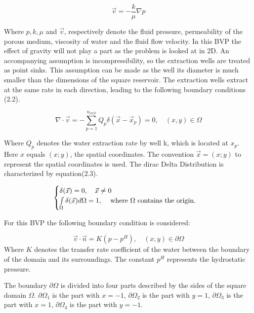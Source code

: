 \documentclass[a4paper]{report}
\begin{document}
\begin{equation}
\vec{v}=-\frac{k}{\mu}\nabla p
\end{equation}
\medskip

Where $ p, k, \mu$ and $\vec{v}$, respectively denote the 
fluid pressure, permeability of the porous medium, viscosity of water and the fluid flow velocity. In this BVP the effect of gravity will not play a part as the problem is looked at in 2D. An accompanying assumption is incompressibility, so the extraction wells are treated as point sinks. This assumption can be made as the well its diameter is much smaller than the dimensions of the square reservoir. The extraction wells extract at the same rate in each direction, leading to the following boundary conditions (2.2).


\begin{equation}
	\nabla\cdot\vec{v}=-\sum_{p=1}^{n_{well}}Q_p\delta(\vec{x}-\vec{x}_p)=0,\quad (x,y) 	\in\Omega 
\end{equation}

Where $Q_p$ denotes the water extraction rate by well k, which is located at $x_p$. Here $x$ equals $(x;y)$, the spatial coordinates.  The convention $\vec{x} = (x; y) $ to represent the spatial coordinates is used. The dirac Delta Distribution is characterized by equation(2.3).

\begin{equation}
	\begin{cases} 
		\delta(\vec{x}) = 0,\quad  \vec{x} \neq 0 \\
		 \int\limits_{\Omega}\delta(\vec{x})d\Omega = 1, \quad $  where $\Omega $  contains the origin.$
	\end{cases} 
\end{equation}

\medskip

For this BVP the following boundary condition is considered: 

\begin{equation}
	\vec{v}\cdot\vec{n}=K(p-p^H), \quad (x,y) \in  \partial\Omega
\end{equation}
Where $K$ denotes the transfer rate coefficient of the water between the boundary of the domain and its surroundings. The constant $p^H$ represents the hydrostatic pressure. 

The boundary $\partial\Omega$ is divided into four parts described by the sides of the square domain $\Omega$. $\partial\Omega_1$ is the part with $x = -1$, $\partial\Omega_2$ is the part with $y = 1$, $\partial\Omega_3$ is the part with $x = 1$, $\partial\Omega_4$ is the part with $y = -1$.
\newpage
\end{document}
